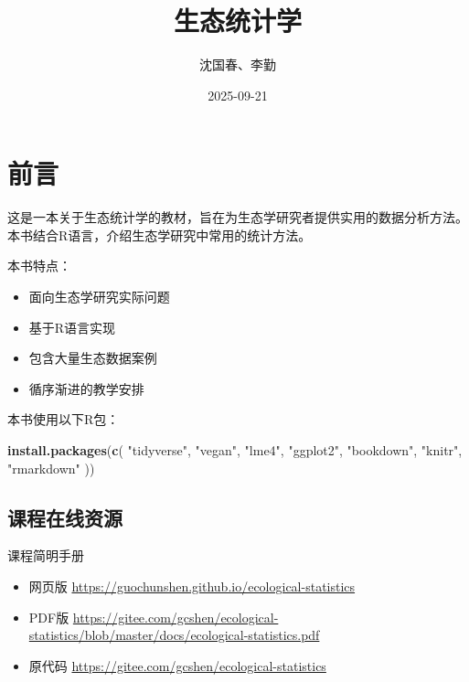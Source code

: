 \documentclass[
]{book}
\title{生态统计学}
\author{沈国春、李勤}
\date{2025-09-21}
\newenvironment{Shaded}{\begin{snugshade}}{\end{snugshade}}
\newcommand{\FunctionTok}[1]{\textcolor[rgb]{0.13,0.29,0.53}{\textbf{#1}}}
\newcommand{\NormalTok}[1]{#1}
\newcommand{\StringTok}[1]{\textcolor[rgb]{0.31,0.60,0.02}{#1}}
\providecommand{\tightlist}{%
  \setlength{\itemsep}{0pt}\setlength{\parskip}{0pt}}
\begin{document}
\maketitle

{
\setcounter{tocdepth}{1}
\tableofcontents
}
\hypertarget{ux524dux8a00}{%
\chapter*{前言}\label{ux524dux8a00}}

这是一本关于生态统计学的教材，旨在为生态学研究者提供实用的数据分析方法。本书结合R语言，介绍生态学研究中常用的统计方法。

本书特点：

\begin{itemize}
\tightlist
\item
  面向生态学研究实际问题
\item
  基于R语言实现
\item
  包含大量生态数据案例
\item
  循序渐进的教学安排
\end{itemize}

本书使用以下R包：

\begin{Shaded}
\begin{Highlighting}[]
\FunctionTok{install.packages}\NormalTok{(}\FunctionTok{c}\NormalTok{(}
  \StringTok{"tidyverse"}\NormalTok{, }\StringTok{"vegan"}\NormalTok{, }\StringTok{"lme4"}\NormalTok{, }\StringTok{"ggplot2"}\NormalTok{, }
  \StringTok{"bookdown"}\NormalTok{, }\StringTok{"knitr"}\NormalTok{, }\StringTok{"rmarkdown"}
\NormalTok{))}
\end{Highlighting}
\end{Shaded}

\hypertarget{ux8bfeux7a0bux5728ux7ebfux8d44ux6e90}{%
\section{课程在线资源}\label{ux8bfeux7a0bux5728ux7ebfux8d44ux6e90}}

课程简明手册

\begin{itemize}
\tightlist
\item
  网页版 \url{https://guochunshen.github.io/ecological-statistics}
\item
  PDF版 \url{https://gitee.com/gcshen/ecological-statistics/blob/master/docs/ecological-statistics.pdf}
\item
  原代码 \url{https://gitee.com/gcshen/ecological-statistics}
\end{itemize}
\end{document}
